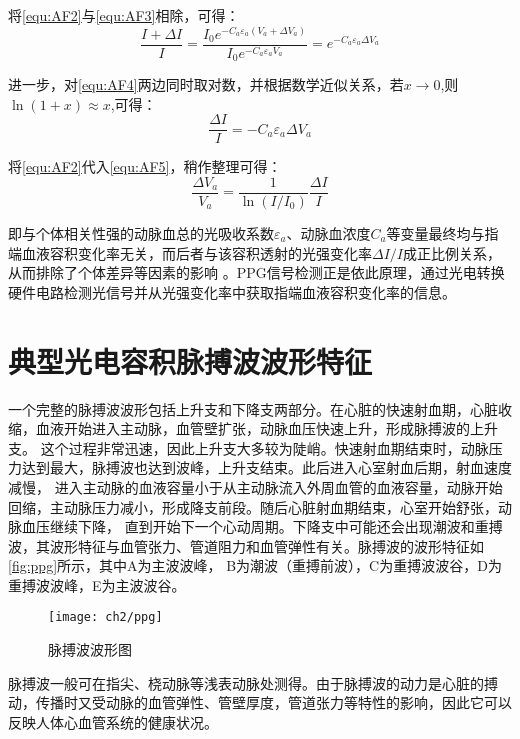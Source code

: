 将\autoref{equ:AF2}与\autoref{equ:AF3}相除，可得：
\begin{equation}
    \label{equ:AF4}
    \frac{I+\Delta I}{I}=\frac{I_{0}e^{-C_{a}\varepsilon _{a}(V_{a}+\Delta V_{a})}}{I_{0}e^{-C_{a}\varepsilon _{a}V_{a}}}=e^{-C_{a}\varepsilon _{a}\Delta V_{a}} 
\end{equation}

进一步，对\autoref{equ:AF4}两边同时取对数，并根据数学近似关系，若$x\rightarrow 0$,则$\ln(1+x)\approx x$,可得：
\begin{equation}
    \label{equ:AF5}
    \frac{\Delta I}{I}=-C_{a}\varepsilon _{a}\Delta V_{a}
\end{equation}

将\autoref{equ:AF2}代入\autoref{equ:AF5}，稍作整理可得：
\begin{equation}
    \label{equ:AF6}
    \frac{\Delta V_{a}}{V_{a}}=\frac{1}{\ln(I/I_{0})}\frac{\Delta I}{I}
\end{equation}

即与个体相关性强的动脉血总的光吸收系数$\varepsilon _{a}$、动脉血浓度$C_{a}$等变量最终均与指端血液容积变化率无关，而后者与该容积透射的光强变化率$\Delta I/I$成正比例关系，从而排除了个体差异等因素的影响
\cite{1980Spectrophotometric,4122392,PPGYY}。PPG信号检测正是依此原理，通过光电转换硬件电路检测光信号并从光强变化率中获取指端血液容积变化率的信息。
\section{典型光电容积脉搏波波形特征}
一个完整的脉搏波波形包括上升支和下降支两部分。在心脏的快速射血期，心脏收缩，血液开始进入主动脉，血管壁扩张，动脉血压快速上升，形成脉搏波的上升支。
这个过程非常迅速，因此上升支大多较为陡峭。快速射血期结束时，动脉压力达到最大，脉搏波也达到波峰，上升支结束。此后进入心室射血后期，射血速度减慢，
进入主动脉的血液容量小于从主动脉流入外周血管的血液容量，动脉开始回缩，主动脉压力减小，形成降支前段。随后心脏射血期结束，心室开始舒张，动脉血压继续下降，
直到开始下一个心动周期。下降支中可能还会出现潮波和重搏波，其波形特征与血管张力、管道阻力和血管弹性有关。脉搏波的波形特征如\autoref{fig:ppg}所示，其中A为主波波峰，
B为潮波（重搏前波），C为重搏波波谷，D为重搏波波峰，E为主波波谷。
\begin{figure}[htbp]
\centering
\texttt{[image: ch2/ppg]}
\caption{\label{fig:ppg}脉搏波波形图}
\end{figure}
脉搏波一般可在指尖、桡动脉等浅表动脉处测得。由于脉搏波的动力是心脏的搏动，传播时又受动脉的血管弹性、管壁厚度，管道张力等特性的影响，因此它可以反映人体心血管系统的健康状况。

